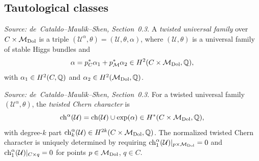 \subsection{Tautological classes}


\begin{definition}
  \label{def:TwistedUniversalFamily}
  \textit{Source: de~Cataldo--Maulik--Shen, Section~0.3.}
  A \emph{twisted universal family} over \(C \times \mathcal{M}_{\mathrm{Dol}}\) is a triple
  \((\mathcal{U}^\alpha, \theta) = (\mathcal{U}, \theta, \alpha)\), where
  \((\mathcal{U},\theta)\) is a universal family of stable Higgs bundles and
  \[
    \alpha = p_C^* \alpha_1 + p_{\mathcal{M}}^* \alpha_2
      \in H^2(C \times \mathcal{M}_{\mathrm{Dol}}, \mathbb{Q}),
  \]
  with \(\alpha_1 \in H^2(C, \mathbb{Q})\) and
  \(\alpha_2 \in H^2(\mathcal{M}_{\mathrm{Dol}}, \mathbb{Q})\).
\end{definition}

\begin{definition}
  \label{def:TwistedChernChar}
  \textit{Source: de~Cataldo--Maulik--Shen, Section~0.3.}
  For a twisted universal family \((\mathcal{U}^\alpha, \theta)\), the
  \emph{twisted Chern character} is
  \[
    \operatorname{ch}^\alpha(\mathcal{U}) = \operatorname{ch}(\mathcal{U}) \cup \exp(\alpha)
      \in H^*(C \times \mathcal{M}_{\mathrm{Dol}}, \mathbb{Q}),
  \]
  with degree-\(k\) part
  \(\operatorname{ch}_k^\alpha(\mathcal{U}) \in H^{2k}(C \times \mathcal{M}_{\mathrm{Dol}}, \mathbb{Q})\).
  The normalized twisted Chern character is uniquely determined by requiring
  \(\operatorname{ch}_1^\alpha(\mathcal{U})|_{p \times \mathcal{M}_{\mathrm{Dol}}} = 0\) and
  \(\operatorname{ch}_1^\alpha(\mathcal{U})|_{C \times q} = 0\) for points
  \(p \in \mathcal{M}_{\mathrm{Dol}}\), \(q \in C\).
\end{definition}

